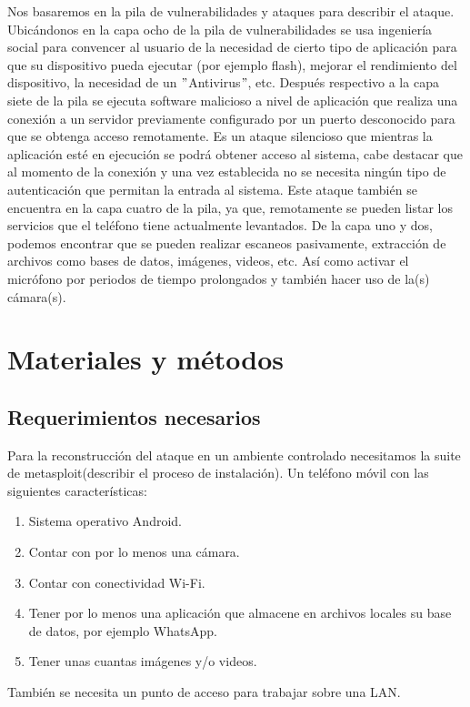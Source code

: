 \documentclass[12pt,twocolumn]{report}
\begin{document}
Nos basaremos en la pila de vulnerabilidades y ataques para describir el ataque. Ubicándonos en la capa ocho de la pila de 
vulnerabilidades se usa ingeniería social para 
convencer al usuario de la necesidad de cierto tipo de aplicación para que su dispositivo pueda ejecutar (por ejemplo flash), 
mejorar el rendimiento del dispositivo, la necesidad de un $"$Antivirus$"$, etc. Después respectivo a la capa siete de la pila 
se ejecuta software malicioso a nivel de aplicación que realiza una conexión a un servidor previamente configurado por un puerto 
desconocido para que se obtenga acceso remotamente. Es un ataque silencioso que mientras la aplicación esté en ejecución se podrá
obtener acceso al sistema, cabe destacar que al momento de la conexión y una vez establecida no se necesita ningún tipo de 
autenticación que permitan la entrada al sistema. Este ataque también se encuentra en la capa cuatro de la pila, ya que, 
remotamente se pueden listar los servicios que el teléfono tiene actualmente levantados. De la capa uno y dos, podemos encontrar 
que se pueden realizar escaneos pasivamente, extracción de archivos como bases de datos, imágenes, videos, etc. Así como activar
el micrófono por periodos de tiempo prolongados y también hacer uso de la(s) cámara(s).

\section{Materiales y métodos}
\subsection{Requerimientos necesarios}
Para la reconstrucción del ataque en un ambiente controlado necesitamos la suite de metasploit(describir el proceso de 
instalación). Un teléfono móvil con las siguientes características:
\begin{enumerate}
\item Sistema operativo Android.
\item Contar con por lo menos una cámara.
\item Contar con conectividad Wi-Fi.
\item Tener por lo menos una aplicación que almacene en archivos locales su base de datos, por ejemplo WhatsApp.
\item Tener unas cuantas imágenes y/o videos.
\end{enumerate}

También se necesita un punto de acceso para trabajar sobre una LAN.




\end{document}
